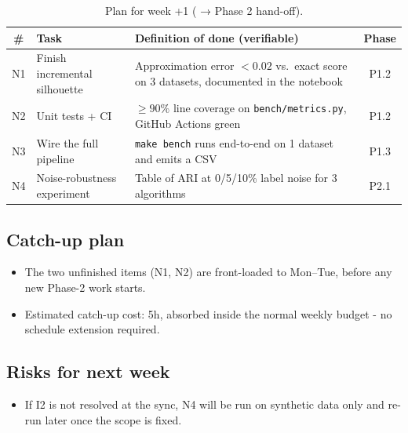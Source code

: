 \begin{table}[H]
\centering
\caption{Plan for week \number\numexpr\WeekNo+1\relax{} (\PhaseName{} → Phase 2 hand-off).}
\label{tab:next}
\small
\begin{tabularx}{\textwidth}{@{}c L L c@{}}
\toprule
\textbf{\#} & \textbf{Task} & \textbf{Definition of done (verifiable)} & \textbf{Phase} \\
\midrule
N1 & Finish incremental silhouette & Approximation error $< 0.02$ vs.\ exact score on 3 datasets, documented in the notebook & P1.2 \\
N2 & Unit tests + CI              & $\geq 90\%$ line coverage on \texttt{bench/metrics.py}, GitHub Actions green & P1.2 \\
N3 & Wire the full pipeline       & \texttt{make bench} runs end-to-end on 1 dataset and emits a CSV & P1.3 \\
N4 & Noise-robustness experiment  & Table of ARI at 0/5/10\% label noise for 3 algorithms & P2.1 \\
\bottomrule
\end{tabularx}
\end{table}

\subsection*{Catch-up plan}
\begin{itemize}
  \item The two unfinished items (N1, N2) are front-loaded to Mon–Tue,
        before any new Phase-2 work starts.
  \item Estimated catch-up cost: 5h, absorbed inside the normal weekly budget
        - no schedule extension required.
\end{itemize}

\subsection*{Risks for next week}
\begin{itemize}
  \item If I2 is not resolved at the sync, N4 will be run on synthetic data
        only and re-run later once the scope is fixed.
\end{itemize}

